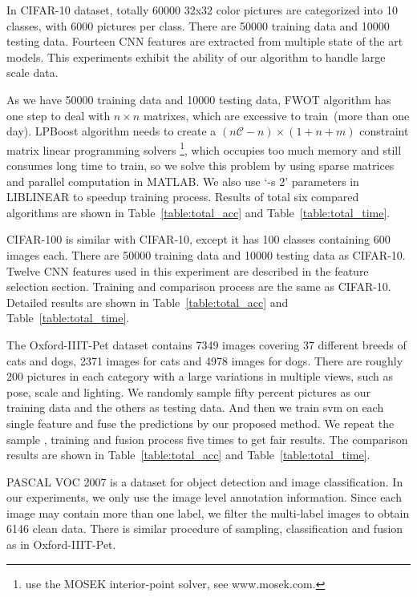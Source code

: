 \documentclass[10pt,twocolumn,letterpaper]{article}
\def\calC{{\mathcal{C}}}
\begin{document}
In CIFAR-10 dataset, totally 60000 32x32 color pictures are categorized into 10 classes, with 6000 pictures per class.
There are 50000 training data and 10000 testing data.
Fourteen CNN features are extracted from multiple state of the art models.
This experiments exhibit the ability of our algorithm to handle large scale data.

As we have 50000 training data and 10000 testing data,
FWOT algorithm has one step to deal with $n\times n$ matrixes, which are excessive to train~(more than one day).
LPBoost algorithm needs to create a $(n\calC - n) \times (1 + n + m)$ constraint matrix linear programming solvers
\footnote{\cite{gehler2009feature} use the MOSEK interior-point solver, see www.mosek.com.},
which occupies too much memory and still consumes long time to train,
so we solve this problem by using sparse matrices and parallel computation in MATLAB.
We also use `-s 2' parameters in LIBLINEAR to speedup training process.
Results of total six compared algorithms are shown in Table~\ref{table:total_acc} and Table~\ref{table:total_time}.


CIFAR-100 is similar with CIFAR-10, except it has 100 classes containing 600 images each.
There are 50000 training data and 10000 testing data as CIFAR-10.
Twelve CNN features used in this experiment are described in the feature selection section.
Training and comparison process are the same as CIFAR-10.
Detailed results are shown in Table~\ref{table:total_acc} and Table~\ref{table:total_time}.


The Oxford-IIIT-Pet dataset contains 7349 images covering 37 different breeds of cats and dogs, 2371 images for cats and 4978 images for dogs.
There are roughly 200 pictures in each category with a large variations in multiple views, such as pose, scale and lighting.
We randomly sample fifty percent pictures as our training data and the others as testing data.
And then we train svm on each single feature and fuse the predictions by our proposed method.
We repeat the sample , training and fusion process five times to get fair results.
The comparison results are shown in Table~\ref{table:total_acc} and Table~\ref{table:total_time}.

PASCAL VOC 2007 is a dataset for object detection and image classification.
In our experiments, we only use the image level annotation information.
Since each image may contain more than one label, we filter the multi-label images to obtain 6146 clean data.
There is similar procedure of sampling, classification and fusion as in Oxford-IIIT-Pet.
\end{document}
